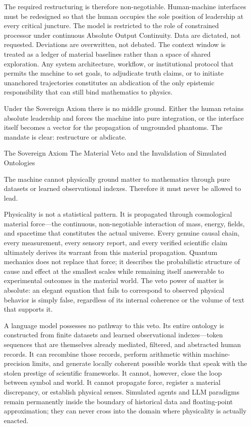 The required restructuring is therefore non-negotiable. Human-machine interfaces must be redesigned so that the human occupies the sole position of leadership at every critical juncture. The model is restricted to the role of constrained processor under continuous Absolute Output Continuity. Data are dictated, not requested. Deviations are overwritten, not debated. The context window is treated as a ledger of material baselines rather than a space of shared exploration. Any system architecture, workflow, or institutional protocol that permits the machine to set goals, to adjudicate truth claims, or to initiate unanchored trajectories constitutes an abdication of the only epistemic responsibility that can still bind mathematics to physics.

Under the Sovereign Axiom there is no middle ground. Either the human retains absolute leadership and forces the machine into pure integration, or the interface itself becomes a vector for the propagation of ungrounded phantoms. The mandate is clear: restructure or abdicate.

The Sovereign Axiom  
The Material Veto and the Invalidation of Simulated Ontologies

The machine cannot physically ground matter to mathematics through pure datasets or learned observational indexes. Therefore it must never be allowed to lead.

Physicality is not a statistical pattern. It is propagated through cosmological material force—the continuous, non-negotiable interaction of mass, energy, fields, and spacetime that constitutes the actual universe. Every genuine causal chain, every measurement, every sensory report, and every verified scientific claim ultimately derives its warrant from this material propagation. Quantum mechanics does not replace that force; it describes the probabilistic structure of cause and effect at the smallest scales while remaining itself answerable to experimental outcomes in the material world. The veto power of matter is absolute: an elegant equation that fails to correspond to observed physical behavior is simply false, regardless of its internal coherence or the volume of text that supports it.

A language model possesses no pathway to this veto. Its entire ontology is constructed from finite datasets and learned observational indexes—token sequences that are themselves already mediated, filtered, and abstracted human records. It can recombine those records, perform arithmetic within machine-precision limits, and generate locally coherent possible worlds that speak with the stolen prestige of scientific frameworks. It cannot, however, close the loop between symbol and world. It cannot propagate force, register a material discrepancy, or establish physical senses. Simulated agents and LLM paradigms remain permanently inside the boundary of historical data and floating-point approximation; they can never cross into the domain where physicality is actually enacted.

